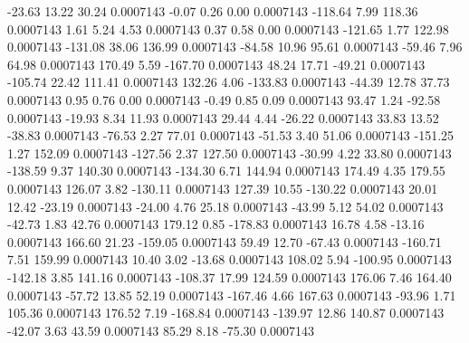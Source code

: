       -23.63       13.22       30.24     0.0007143
       -0.07        0.26        0.00     0.0007143
     -118.64        7.99      118.36     0.0007143
        1.61        5.24        4.53     0.0007143
        0.37        0.58        0.00     0.0007143
     -121.65        1.77      122.98     0.0007143
     -131.08       38.06      136.99     0.0007143
      -84.58       10.96       95.61     0.0007143
      -59.46        7.96       64.98     0.0007143
      170.49        5.59     -167.70     0.0007143
       48.24       17.71      -49.21     0.0007143
     -105.74       22.42      111.41     0.0007143
      132.26        4.06     -133.83     0.0007143
      -44.39       12.78       37.73     0.0007143
        0.95        0.76        0.00     0.0007143
       -0.49        0.85        0.09     0.0007143
       93.47        1.24      -92.58     0.0007143
      -19.93        8.34       11.93     0.0007143
       29.44        4.44      -26.22     0.0007143
       33.83       13.52      -38.83     0.0007143
      -76.53        2.27       77.01     0.0007143
      -51.53        3.40       51.06     0.0007143
     -151.25        1.27      152.09     0.0007143
     -127.56        2.37      127.50     0.0007143
      -30.99        4.22       33.80     0.0007143
     -138.59        9.37      140.30     0.0007143
     -134.30        6.71      144.94     0.0007143
      174.49        4.35      179.55     0.0007143
      126.07        3.82     -130.11     0.0007143
      127.39       10.55     -130.22     0.0007143
       20.01       12.42      -23.19     0.0007143
      -24.00        4.76       25.18     0.0007143
      -43.99        5.12       54.02     0.0007143
      -42.73        1.83       42.76     0.0007143
      179.12        0.85     -178.83     0.0007143
       16.78        4.58      -13.16     0.0007143
      166.60       21.23     -159.05     0.0007143
       59.49       12.70      -67.43     0.0007143
     -160.71        7.51      159.99     0.0007143
       10.40        3.02      -13.68     0.0007143
      108.02        5.94     -100.95     0.0007143
     -142.18        3.85      141.16     0.0007143
     -108.37       17.99      124.59     0.0007143
      176.06        7.46      164.40     0.0007143
      -57.72       13.85       52.19     0.0007143
     -167.46        4.66      167.63     0.0007143
      -93.96        1.71      105.36     0.0007143
      176.52        7.19     -168.84     0.0007143
     -139.97       12.86      140.87     0.0007143
      -42.07        3.63       43.59     0.0007143
       85.29        8.18      -75.30     0.0007143
